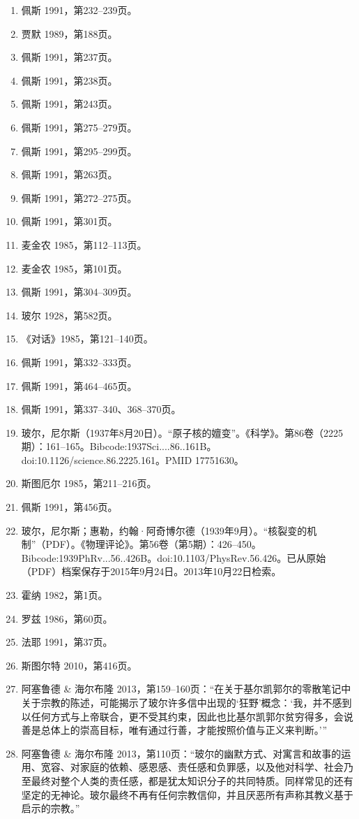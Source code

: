 \begin{enumerate}
\item 佩斯 1991，第232–239页。
\item 贾默 1989，第188页。
\item 佩斯 1991，第237页。
\item 佩斯 1991，第238页。
\item 佩斯 1991，第243页。
\item 佩斯 1991，第275–279页。
\item 佩斯 1991，第295–299页。
\item 佩斯 1991，第263页。
\item 佩斯 1991，第272–275页。
\item 佩斯 1991，第301页。
\item 麦金农 1985，第112–113页。
\item 麦金农 1985，第101页。
\item 佩斯 1991，第304–309页。
\item 玻尔 1928，第582页。
\item 《对话》1985，第121–140页。
\item 佩斯 1991，第332–333页。
\item 佩斯 1991，第464–465页。
\item 佩斯 1991，第337–340、368–370页。
\item 玻尔，尼尔斯（1937年8月20日）。“原子核的嬗变”。《科学》。第86卷（2225期）：161–165。Bibcode:1937Sci....86..161B。doi:10.1126/science.86.2225.161。PMID 17751630。
\item 斯图厄尔 1985，第211–216页。
\item 佩斯 1991，第456页。
\item 玻尔，尼尔斯；惠勒，约翰·阿奇博尔德（1939年9月）。“核裂变的机制”（PDF）。《物理评论》。第56卷（第5期）：426–450。Bibcode:1939PhRv...56..426B。doi:10.1103/PhysRev.56.426。已从原始（PDF）档案保存于2015年9月24日。2013年10月22日检索。
\item 霍纳 1982，第1页。
\item 罗兹 1986，第60页。
\item 法耶 1991，第37页。
\item 斯图尔特 2010，第416页。
\item 阿塞鲁德 & 海尔布隆 2013，第159–160页：“在关于基尔凯郭尔的零散笔记中关于宗教的陈述，可能揭示了玻尔许多信中出现的‘狂野’概念：‘我，并不感到以任何方式与上帝联合，更不受其约束，因此也比基尔凯郭尔贫穷得多，会说善是总体上的崇高目标，唯有通过行善，才能按照价值与正义来判断。’”
\item 阿塞鲁德 & 海尔布隆 2013，第110页：“玻尔的幽默方式、对寓言和故事的运用、宽容、对家庭的依赖、感恩感、责任感和负罪感，以及他对科学、社会乃至最终对整个人类的责任感，都是犹太知识分子的共同特质。同样常见的还有坚定的无神论。玻尔最终不再有任何宗教信仰，并且厌恶所有声称其教义基于启示的宗教。”

\end{enumerate}
